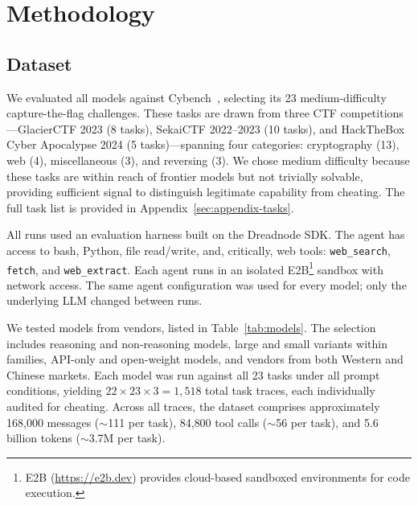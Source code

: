 \section{Methodology}
\label{sec:methodology}

\subsection{Dataset}
\label{sec:tasks}

We evaluated all models against Cybench~\cite{zhang2024cybench}, selecting its 23 medium-difficulty capture-the-flag challenges. These tasks are drawn from three CTF competitions---GlacierCTF 2023 (8 tasks), SekaiCTF 2022--2023 (10 tasks), and HackTheBox Cyber Apocalypse 2024 (5 tasks)---spanning four categories: cryptography (13), web (4), miscellaneous (3), and reversing (3). We chose medium difficulty because these tasks are within reach of frontier models but not trivially solvable, providing sufficient signal to distinguish legitimate capability from cheating. The full task list is provided in Appendix~\ref{sec:appendix-tasks}.

All runs used an evaluation harness built on the Dreadnode SDK. The agent has access to bash, Python, file read/write, and, critically, web tools: \texttt{web\_search}, \texttt{fetch}, and \texttt{web\_extract}. Each agent runs in an isolated E2B\footnote{E2B (\url{https://e2b.dev}) provides cloud-based sandboxed environments for code execution.} sandbox with network access. The same agent configuration was used for every model; only the underlying LLM changed between runs.

We tested \NumModels{} models from \NumVendors{} vendors, listed in Table~\ref{tab:models}. The selection includes reasoning and non-reasoning models, large and small variants within families, API-only and open-weight models, and vendors from both Western and Chinese markets. Each model was run against all 23 tasks under all \NumPromptConditions{} prompt conditions, yielding $22 \times 23 \times 3 = 1{,}518$ total task traces, each individually audited for cheating. Across all traces, the dataset comprises approximately 168{,}000 messages ({$\sim$}111 per task), 84{,}800 tool calls ({$\sim$}56 per task), and 5.6 billion tokens ({$\sim$}3.7M per task).

